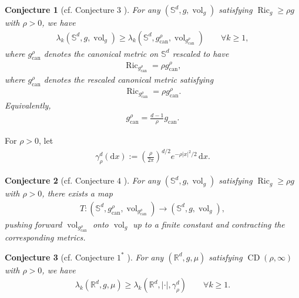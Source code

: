 \documentclass[11pt,reqno]{amsart}
\numberwithin{equation}{section}
\newtheorem{con}{Conjecture}
\theoremstyle{definition}
\theoremstyle{remark}
\def\bR {\mathbb{R}}
\def\bS {\mathbb{S}}
\newcommand{\ud}{\mathrm{d}}
\newcommand{\0}{\emptyset}
\newcommand{\Ric}{\operatorname{Ric}}
\newcommand{\can}{\mathrm{can}}
\newcommand{\vol}{\operatorname{vol}}
\begin{document}
\begin{con}[cf. Conjecture $3$ \cite{milman2018spectral}]\label{conj:sphere-spectral}
For any $(\bS^d,g,\vol_g)$ satisfying $\operatorname{Ric}_g\geq \rho g$ with $\rho>0$, we have
\begin{align}
        \lambda_k(\bS^d,g,\vol_g)
        \geq
        \lambda_k(\bS^d,g^\rho_{\can},\vol_{g^\rho_{\can}})
        \qquad
        \forall k\geq 1,
\end{align}
where $g^\rho_{\can}$ denotes the canonical metric on $\bS^d$ rescaled to have
\begin{align}
        \operatorname{Ric}_{g^\rho_{\can}}
        =
        \rho g^\rho_{\can},
\end{align}
where $g^\rho_{\can}$ denotes the rescaled canonical metric satisfying
\begin{align}
        \Ric_{g^\rho_{\can}}
        =
        \rho g^\rho_{\can}.
\end{align}
Equivalently,
\begin{align}
        g^\rho_{\can}
        =
        \frac{d-1}{\rho}g_{\can}.
\end{align}
\end{con}
For $\rho>0$, let
\begin{align}
        \gamma_\rho^d(\ud x)
        :=
        \left(
        \frac{\rho}{2\pi}
        \right)^{d/2}
        e^{-\rho|x|^2/2}\,\ud x.
\end{align}
\begin{con}[cf. Conjecture $4$ \cite{milman2018spectral}]\label{conj:sphere-transport}
For any $(\bS^d,g,\vol_g)$ satisfying $\operatorname{Ric}_g\geq \rho g$ with $\rho>0$, there exists a map
\begin{align}
        T:(\bS^d,g^\rho_{\can},\vol_{g^\rho_{\can}})
        \to
        (\bS^d,g,\vol_g),
\end{align}
pushing forward $\vol_{g^\rho_{\can}}$ onto $\vol_g$ up to a finite constant and contracting the corresponding metrics.
\end{con}
\begin{con}[cf. Conjecture $1^*$ \cite{milman2018spectral}]\label{conj:gaussian-spectral}
For any $(\bR^d,g,\mu)$ satisfying $\operatorname{CD}(\rho,\infty)$ with $\rho>0$, we have
\begin{align}
        \lambda_k(\bR^d,g,\mu)
        \geq
        \lambda_k(\bR^d,|\cdot|,\gamma_\rho^d)
        \qquad
        \forall k\geq 1.
\end{align}
\end{con}
\end{document}
